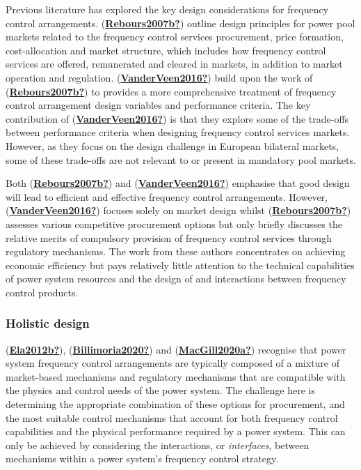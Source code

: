 \documentclass[12pt,a4paper,]{report}
\begin{document}
Previous literature has explored the key design considerations for
frequency control arrangements.
(\protect\hyperlink{ref-Rebours2007b}{\textbf{Rebours2007b?}}) outline
design principles for power pool markets related to the frequency
control services procurement, price formation, cost-allocation and
market structure, which includes how frequency control services are
offered, remunerated and cleared in markets, in addition to market
operation and regulation.
(\protect\hyperlink{ref-VanderVeen2016}{\textbf{VanderVeen2016?}}) build
upon the work of
(\protect\hyperlink{ref-Rebours2007b}{\textbf{Rebours2007b?}}) to
provides a more comprehensive treatment of frequency control arrangement
design variables and performance criteria. The key contribution of
(\protect\hyperlink{ref-VanderVeen2016}{\textbf{VanderVeen2016?}}) is
that they explore some of the trade-offs between performance criteria
when designing frequency control services markets. However, as they
focus on the design challenge in European bilateral markets, some of
these trade-offs are not relevant to or present in mandatory pool
markets.

Both (\protect\hyperlink{ref-Rebours2007b}{\textbf{Rebours2007b?}}) and
(\protect\hyperlink{ref-VanderVeen2016}{\textbf{VanderVeen2016?}})
emphasise that good design will lead to efficient and effective
frequency control arrangements. However,
(\protect\hyperlink{ref-VanderVeen2016}{\textbf{VanderVeen2016?}})
focuses solely on market design whilst
(\protect\hyperlink{ref-Rebours2007b}{\textbf{Rebours2007b?}}) assesses
various competitive procurement options but only briefly discusses the
relative merits of compulsory provision of frequency control services
through regulatory mechanisms. The work from these authors concentrates
on achieving economic efficiency but pays relatively little attention to
the technical capabilities of power system resources and the design of
and interactions between frequency control products.

\hypertarget{holistic-design}{%
\subsubsection{Holistic design}\label{holistic-design}}

(\protect\hyperlink{ref-Ela2012b}{\textbf{Ela2012b?}}),
(\protect\hyperlink{ref-Billimoria2020}{\textbf{Billimoria2020?}}) and
(\protect\hyperlink{ref-MacGill2020a}{\textbf{MacGill2020a?}}) recognise
that power system frequency control arrangements are typically composed
of a mixture of market-based mechanisms and regulatory mechanisms that
are compatible with the physics and control needs of the power system.
The challenge here is determining the appropriate combination of these
options for procurement, and the most suitable control mechanisms that
account for both frequency control capabilities and the physical
performance required by a power system. This can only be achieved by
considering the interactions, or \emph{interfaces}, between mechanisms
within a power system's frequency control strategy.
\end{document}
